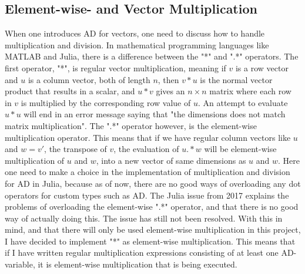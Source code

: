 \subsection{Element-wise- and Vector Multiplication}
When one introduces AD for vectors, one need to discuss how to handle multiplication and division. In mathematical programming languages like MATLAB and Julia, there is a difference between the "*" and ".*" operators. The first operator, "*", is regular vector multiplication, meaning if $v$ is a row vector and $u$ is a column vector, both of length $n$, then $v*u$ is the normal vector product that results in a scalar, and $u*v$ gives an $n\times n$ matrix where each row in $v$ is multiplied by the corresponding row value of $u$. An attempt to evaluate $u*u$ will end in an error message saying that "the dimensions does not match matrix multiplication". The ".*" operator however, is the element-wise multiplication operator. This means that if we have regular column vectors like $u$ and $w = v'$, the transpose of $v$, the evaluation of $u.*w$ will be element-wise multiplication of $u$ and $w$, into a new vector of same dimensions as $u$ and $w$. Here one need to make a choice in the implementation of multiplication and division for AD in Julia, because as of now, there are no good ways of overloading any dot operators for custom types such as AD. The Julia issue \emph{\cite{JuliaIssueDot}} from 2017 explains the problems of overloading the element-wise ".*" operator, and that there is no good way of actually doing this. The issue has still not been resolved. With this in mind, and that there will only be used element-wise multiplication in this project, I have decided to implement "*" as element-wise multiplication. This means that if I have written regular multiplication expressions consisting of at least one AD-variable, it is element-wise multiplication that is being executed.

